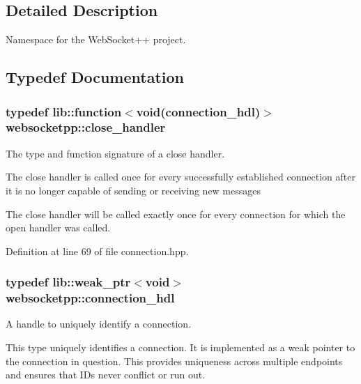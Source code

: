 \subsection{Detailed Description}
Namespace for the Web\+Socket++ project. 

\subsection{Typedef Documentation}
\subsubsection[{\texorpdfstring{close\+\_\+handler}{close\_handler}}]{\setlength{\rightskip}{0pt plus 5cm}typedef lib\+::function$<$void({\bf connection\+\_\+hdl})$>$ {\bf websocketpp\+::close\+\_\+handler}}\hypertarget{namespacewebsocketpp_a27acb39e01cbca06ccc4e4e8eb8f877d}{}\label{namespacewebsocketpp_a27acb39e01cbca06ccc4e4e8eb8f877d}


The type and function signature of a close handler. 

The close handler is called once for every successfully established connection after it is no longer capable of sending or receiving new messages

The close handler will be called exactly once for every connection for which the open handler was called. 

Definition at line 69 of file connection.\+hpp.

\subsubsection[{\texorpdfstring{connection\+\_\+hdl}{connection\_hdl}}]{\setlength{\rightskip}{0pt plus 5cm}typedef lib\+::weak\+\_\+ptr$<$void$>$ {\bf websocketpp\+::connection\+\_\+hdl}}\hypertarget{namespacewebsocketpp_a6b3d26a10ee7229b84b776786332631d}{}\label{namespacewebsocketpp_a6b3d26a10ee7229b84b776786332631d}


A handle to uniquely identify a connection. 

This type uniquely identifies a connection. It is implemented as a weak pointer to the connection in question. This provides uniqueness across multiple endpoints and ensures that I\+Ds never conflict or run out.

